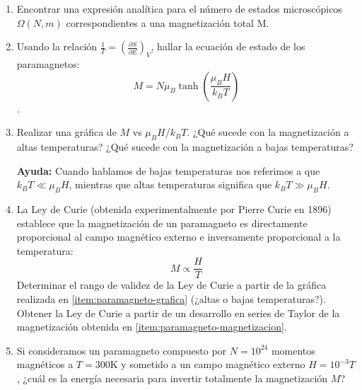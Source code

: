 \documentclass[a4paper,11pt]{article}
\begin{document}
\begin{enumerate}[label=(\alph*),
                  leftmargin=2\parindent,
                  rightmargin=2\parindent]

    \item{Encontrar una expresión analítica para el número de 
          estados microscópicos $\Omega(N, m)$ correspondientes a una 
          magnetización total M.
          }
    
    \item{\label{item:paramagneto-magnetizacion}
          Usando la relación
          $\frac{1}{T} = \left( \frac{\partial S}{\partial E} \right)_V$,
          hallar la ecuación de estado de los paramagnetos:
          $$ M = N \mu_B \tanh \left( \frac{\mu_B H}{k_B T} \right) $$.
          }
    
    \item{\label{item:paramagneto-grafica}
          Realizar una gráfica de $M$ vs $\mu_B H/k_B T$.
          ¿Qué sucede con la magnetización a altas temperaturas?
          ¿Qué sucede con la magnetización a bajas temperaturas?
          }
    
    {\small
    \textbf{Ayuda:} Cuando hablamos de bajas temperaturas nos referimos 
    a que $k_B T \ll \mu_B H$, mientras que altas temperaturas 
    significa que $k_B T \gg \mu_B H$.
    }

    \item{La Ley de Curie (obtenida experimentalmente por Pierre Curie en 1896)
          establece que la magnetización de un paramagneto es 
          directamente proporcional al campo magnético externo e 
          inversamente proporcional a la temperatura:
          $$ M \propto \frac{H}{T} $$
          Determinar el rango de validez de la Ley de Curie a partir de la
          gráfica realizada en \ref{item:paramagneto-grafica}
          (¿altas o bajas temperaturas?).\\
          Obtener la Ley de Curie a partir de un desarrollo en series 
          de Taylor de la magnetización obtenida en 
          \ref{item:paramagneto-magnetizacion}.
          }
    
    \item{Si consideramos un paramagneto compuesto por $N = 10^{24}$ 
          momentos magnéticos a $T = 300 \text{K}$ y sometido a un 
          campo magnético externo $H = 10^{-3} T$,
          ¿cuál es la energía necesaria para invertir totalmente la 
          magnetización $M$?
          }

\end{enumerate}
\end{document}
